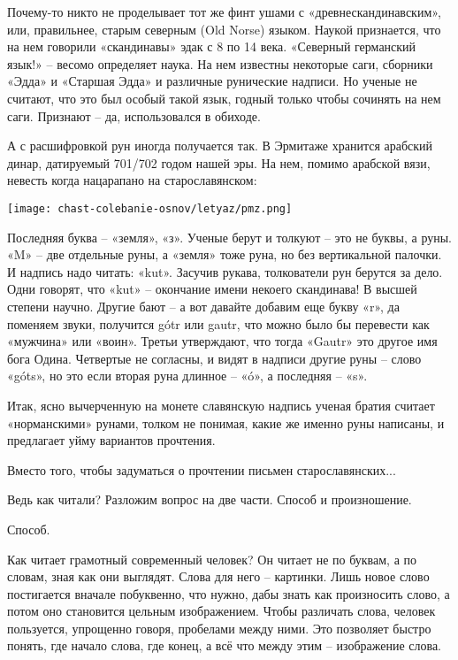 \documentclass[a5paper,11pt,openany]{article}
\begin{document}
Почему-то никто не проделывает тот же финт ушами с «древнескандинавским», или, правильнее, старым северным (Old Norse) языком. Наукой признается, что на нем говорили «скандинавы» эдак с 8 по 14 века. «Северный германский язык!» – весомо определяет наука. На нем известны некоторые саги, сборники «Эдда» и «Старшая Эдда» и различные рунические надписи. Но ученые не считают, что это был особый такой язык, годный только чтобы сочинять на нем саги. Признают – да, использовался в обиходе.

А с расшифровкой рун иногда получается так. В Эрмитаже хранится арабский динар, датируемый 701/702 годом нашей эры. На нем, помимо арабской вязи, невесть когда нацарапано на старославянском:

\begin{center}
\texttt{[image: chast-colebanie-osnov/letyaz/pmz.png]}
\end{center} 

Последняя буква – «земля», «з». Ученые берут и толкуют – это не буквы, а руны. «M» – две отдельные руны, а «земля» тоже руна, но без вертикальной палочки. И надпись надо читать: «kut». Засучив рукава, толкователи рун берутся за дело. Одни говорят, что «kut» – окончание имени некоего скандинава! В высшей степени научно. Другие бают – а вот давайте добавим еще букву «r», да поменяем звуки, получится gótr или gautr, что можно было бы перевести как «мужчина» или «воин». Третьи утверждают, что тогда «Gautr» это другое имя бога Одина. Четвертые не согласны, и видят в надписи другие руны – слово «góts», но это если вторая руна длинное – «ó», а последняя – «s».

Итак, ясно вычерченную на монете славянскую надпись ученая братия считает «норманскими» рунами, толком не понимая, какие же именно руны написаны, и предлагает уйму вариантов прочтения.

Вместо того, чтобы задуматься о прочтении письмен старославянских...

Ведь как читали? Разложим вопрос на две части. Способ и произношение.

Способ. 

Как читает грамотный современный человек? Он читает не по буквам, а по словам, зная как они выглядят. Слова для него – картинки. Лишь новое слово постигается вначале побуквенно, что нужно, дабы знать как произносить слово, а потом оно становится цельным изображением. Чтобы различать слова, человек пользуется, упрощенно говоря, пробелами между ними. Это позволяет быстро понять, где начало слова, где конец, а всё что между этим – изображение слова.
\end{document}
